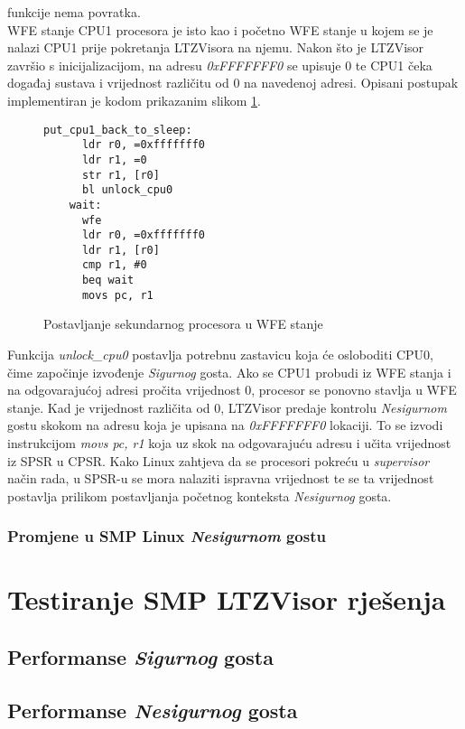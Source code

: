 \documentclass[times, utf8, diplomski, numeric]{fer}
\begin{document}
funkcije nema povratka.\\
WFE stanje CPU1 procesora je isto kao i početno WFE stanje u kojem se je nalazi CPU1 prije pokretanja LTZVisora na njemu.
Nakon što je LTZVisor završio s inicijalizacijom, na adresu \textit{0xFFFFFFF0} se upisuje 0 te CPU1 čeka događaj sustava i
vrijednost različitu od 0 na navedenoj adresi. Opisani postupak implementiran je kodom prikazanim slikom \ref{cpu1_wfe}.
\begin{figure}[H]
  \centering
  \lstset{numbers=left, numbersep=2pt, numberstyle=\tiny, breaklines=true, xleftmargin=.2\textwidth}
  \begin{lstlisting}[firstnumber=1]
    put_cpu1_back_to_sleep:
      ldr r0, =0xfffffff0
      ldr r1, =0
      str r1, [r0]
      bl unlock_cpu0
    wait:
      wfe
      ldr r0, =0xfffffff0
      ldr r1, [r0]
      cmp r1, #0
      beq wait
      movs pc, r1
  \end{lstlisting}
  \caption{Postavljanje sekundarnog procesora u WFE stanje}
  \label{cpu1_wfe}
\end{figure}
Funkcija \textit{unlock\_cpu0} postavlja potrebnu zastavicu koja će osloboditi CPU0, čime započinje izvođenje \textit{Sigurnog}
gosta. Ako se CPU1 probudi iz WFE stanja i na odgovarajućoj adresi pročita vrijednost 0, procesor se ponovno stavlja u WFE
stanje. Kad je vrijednost različita od 0, LTZVisor predaje kontrolu \textit{Nesigurnom} gostu skokom na adresu koja je upisana
na \textit{0xFFFFFFF0} lokaciji. To se izvodi instrukcijom \textit{movs pc, r1} koja uz skok na odgovarajuću adresu i učita
vrijednost iz SPSR u CPSR. Kako Linux zahtjeva da se procesori pokreću u \textit{supervisor} način rada, u SPSR-u se mora
nalaziti ispravna vrijednost te se ta vrijednost postavlja prilikom postavljanja početnog konteksta \textit{Nesigurnog} gosta.

\subsection{Promjene u SMP Linux \textit{Nesigurnom} gostu}

\chapter{Testiranje SMP LTZVisor rješenja}
\section{Performanse \textit{Sigurnog} gosta}
\section{Performanse \textit{Nesigurnog} gosta}
\end{document}
